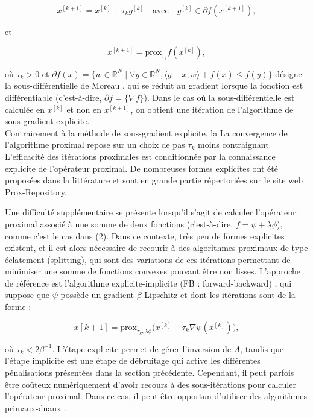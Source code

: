 \documentclass[a4paper, 12pt]{article} %
\begin{document}
\[
x^{[k+1]} = x^{[k]} - \tau_k g^{[k]} \quad \text{avec} \quad g^{[k]}\in \partial f(x^{[k+1]}), \tag{6}
\]

et 

\[
x^{[k+1]} = \text{prox}_{\tau_k} f(x^{[k]}), \tag{7}
\]

où \(\tau_k > 0\) et \(\partial f(x) = \{ w \in \mathbb{R}^N \; | \; \forall y \in \mathbb{R}^N, \langle y - x, w \rangle + f(x) \leq f(y) \}\) désigne la sous-différentielle de Moreau \cite{23}, qui se réduit au gradient lorsque la fonction est différentiable (c'est-à-dire, \(\partial f = \{\nabla f\}\)). Dans le cas où la sous-différentielle est calculée en \(x^{[k]}\) et non en \(x^{[k+1]}\), on obtient une itération de l'algorithme de sous-gradient explicite.\\
Contrairement à la méthode de sous-gradient explicite, la
La convergence de l'algorithme proximal repose sur un choix de pas \(\tau_k\) moins contraignant. L'efficacité des itérations proximales est conditionnée par la connaissance explicite de l'opérateur proximal. De nombreuses formes explicites ont été proposées dans la littérature et sont en grande partie répertoriées sur le site web Prox-Repository.

Une difficulté supplémentaire se présente lorsqu'il s'agit de calculer l'opérateur proximal associé à une somme de deux fonctions (c'est-à-dire, \(f = \psi + \lambda \phi\)), comme c'est le cas dans (2). Dans ce contexte, très peu de formes explicites existent, et il est alors nécessaire de recourir à des algorithmes proximaux de type éclatement (splitting), qui sont des variations de ces itérations permettant de minimiser une somme de fonctions convexes pouvant être non lisses. L'approche de référence est l'algorithme explicite-implicite (FB : forward-backward) \cite{7}, qui suppose que \(\psi\) possède un gradient \(\beta\)-Lipschitz   et dont les itérations sont de la forme :

\[
x[k+1] = \text{prox}_{\tau_k,\lambda \phi} \Big(x^{[k]} - \tau_k \nabla \psi(x^{[k]})\Big), \tag{8}
\]

où \(\tau_k < 2\beta^{-1}\). L'étape explicite permet de gérer l'inversion de \(A\), tandis que l'étape implicite est une étape de débruitage qui active les différentes pénalisations présentées dans la section précédente. Cependant, il peut parfois être coûteux numériquement d'avoir recours à des sous-itérations pour calculer l'opérateur proximal. Dans ce cas, il peut être opportun d'utiliser des algorithmes primaux-duaux \cite{5,11}.
\end{document}
